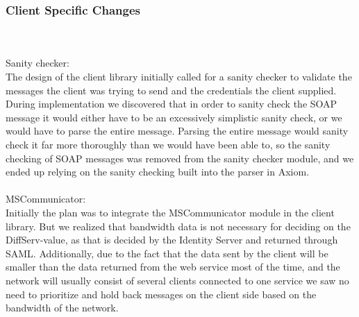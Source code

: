 \subsubsection{Client Specific Changes}\label{Changes:client}
 \\\\
Sanity checker:\\
The design of the client library initially called for a sanity checker to validate the messages the client was trying to send and the credentials the client supplied. During implementation we discovered that in order to sanity check the SOAP message it would either have to be an excessively simplistic sanity check, or we would have to parse the entire message. Parsing the entire message would sanity check it far more thoroughly than we would have been able to, so the sanity checking of SOAP messages was removed from the sanity checker module, and we ended up relying on the sanity checking built into the parser in Axiom.
\\\\
MSCommunicator:\\
Initially the plan was to integrate the MSCommunicator module in the client library. But we realized that bandwidth data is not necessary for deciding on the DiffServ-value, as that is decided by the Identity Server and returned through SAML.
Additionally, due to the fact that the data sent by the client will be smaller than the data returned from the web service most of the time, and the network will usually consist of several clients connected to one service we saw no need to prioritize and hold back messages on the client side based on the bandwidth of the network.